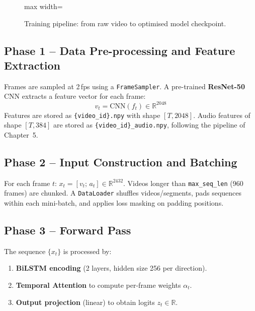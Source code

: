 \documentclass[12pt, a4paper]{report}
\begin{document}
\begin{figure}[H]
\begin{adjustbox}{max width=\textwidth}
\end{adjustbox}
\caption{Training pipeline: from raw video to optimised model checkpoint.}
\label{fig:train_pipeline}
\end{figure}

\subsection{Phase 1 -- Data Pre-processing and Feature Extraction}

Frames are sampled at 2\,fps using a \texttt{FrameSampler}. A pre-trained
\textbf{ResNet-50} CNN extracts a feature vector for each frame:
\[
  v_t = \mathrm{CNN}(f_t) \in \mathbb{R}^{2048}
\]
Features are stored as \texttt{\{video\_id\}.npy} with shape $[T, 2048]$.
Audio features of shape $[T, 384]$ are stored as \texttt{\{video\_id\}\_audio.npy},
following the pipeline of Chapter~5.

\subsection{Phase 2 -- Input Construction and Batching}

For each frame $t$: $x_t = [v_t;\, a_t] \in \mathbb{R}^{2432}$.
Videos longer than \texttt{max\_seq\_len} (960 frames) are chunked.
A \texttt{DataLoader} shuffles videos/segments, pads sequences within each
mini-batch, and applies loss masking on padding positions.

\subsection{Phase 3 -- Forward Pass}

The sequence $\{x_t\}$ is processed by:
\begin{enumerate}[leftmargin=1.5cm]
  \item \textbf{BiLSTM encoding} (2 layers, hidden size 256 per direction).
  \item \textbf{Temporal Attention} to compute per-frame weights $\alpha_t$.
  \item \textbf{Output projection} (linear) to obtain logits $z_t \in \mathbb{R}$.
\end{enumerate}
\end{document}
